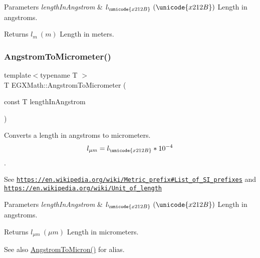 \begin{DoxyParams}{Parameters}
{\em length\+In\+Angstrom} & $ l_{\unicode{x212B}}\ (\unicode{x212B})$ Length in angstroms. \\
\hline
\end{DoxyParams}
\begin{DoxyReturn}{Returns}
$ l_{m}\ (m)$ Length in meters. 
\end{DoxyReturn}
\mbox{\label{group___e_g_x_math-_conversions-_length_conversions-_non-_s_i-_angstrom-_s_i_gab15b376d5a5fc7896a5f5cb6278f782c}} 
\subsubsection{\texorpdfstring{Angstrom\+To\+Micrometer()}{AngstromToMicrometer()}}
{\footnotesize\ttfamily template$<$typename T $>$ \\
T E\+G\+X\+Math\+::\+Angstrom\+To\+Micrometer (\begin{DoxyParamCaption}\item[{const T}]{length\+In\+Angstrom }\end{DoxyParamCaption})}



Converts a length in angstroms to micrometers. \[ l_{\mu m}=l_{\unicode{x212B}} * 10^{-4} \]. 

See \href{https://en.wikipedia.org/wiki/Metric_prefix#List_of_SI_prefixes}{\tt https\+://en.\+wikipedia.\+org/wiki/\+Metric\+\_\+prefix\#\+List\+\_\+of\+\_\+\+S\+I\+\_\+prefixes} and \href{https://en.wikipedia.org/wiki/Unit_of_length}{\tt https\+://en.\+wikipedia.\+org/wiki/\+Unit\+\_\+of\+\_\+length} 
\begin{DoxyParams}{Parameters}
{\em length\+In\+Angstrom} & $ l_{\unicode{x212B}}\ (\unicode{x212B})$ Length in angstroms. \\
\hline
\end{DoxyParams}
\begin{DoxyReturn}{Returns}
$ l_{\mu m}\ (\mu m)$ Length in micrometers. 
\end{DoxyReturn}
\begin{DoxySeeAlso}{See also}
\mbox{\hyperlink{group___e_g_x_math-_conversions-_length_conversions-_non-_s_i-_angstrom-_non-_s_i_ga097787c82296d2767637cd15101ec272}{Angstrom\+To\+Micron()}} for alias. 
\end{DoxySeeAlso}
\mbox{\label{group___e_g_x_math-_conversions-_length_conversions-_non-_s_i-_angstrom-_s_i_ga5c25ae7d55cebff67920d7c059d1e28e}} 
